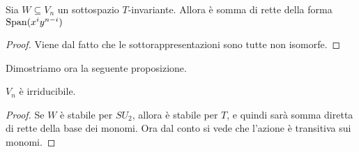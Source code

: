 	\begin{mylemma}
	 Sia $W\subseteq V_n$ un sottospazio $T$-invariante. Allora è somma di rette della forma $\operatorname{Span}(x^iy^{n-i})$
	\end{mylemma}
	\begin{proof}
		Viene dal fatto che le sottorappresentazioni sono tutte non isomorfe.
	\end{proof}

	Dimostriamo ora la seguente proposizione.
	\begin{myprop}
	 $V_n$ è irriducibile.
	\end{myprop}
	\begin{proof}
	 Se $W$ è stabile per $SU_2$, allora è stabile per $T$, e quindi sarà somma diretta di rette della base dei monomi. Ora dal conto si vede che l'azione è transitiva sui monomi. 
	\end{proof}


	




